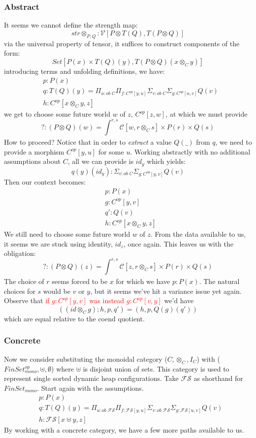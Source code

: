 \documentclass{article}
\newcommand{\red}[1]{\textcolor{red}{#1}}
\begin{document}
\subsubsection{Abstract}
It seems we cannot define the strength map:
\[
    str\otimes_{P,Q} : \mathcal{V}[ P \otimes T(Q), T (P \otimes Q)]
\]
via the universal property of tensor, it suffices to construct components of the form:
\[
    Set[P(x) \times T(Q)(y) ,T(P \otimes Q)(x \otimes_C y) ]
\]
introducing terms and unfolding definitions, we have:
\begin{align*}
    &p : P(x)\\
    &q : T(Q)(y) = \Pi_{u : ob \; C}\Pi_{f : C^{op}[ y , u]}\Sigma_{v : ob \;C}\Sigma_{g : C^{op}[ u , v ]}Q(v)\\
    &h : C^{op}[x\otimes_C y , z]
\end{align*}
we get to choose some future world $w$ of $z$, $C^{op}[z , w]$, 
at which we must provide 
\[ 
    ? : (P \otimes Q)(w) = \int_{}^{r,s} \mathcal{C}[ w , r \otimes_C s ] 
\times P(r) \times Q(s)
\]
How to proceed? Notice that in order to \textit{extract} a value $Q(\_)$ from $q$,
we need to provide a morphism $C^{op}[y , u]$ for some $u$. 
Working abstractly with no additional assumptions about $C$, all we can provide is $id_y$ which yields:
\[
    q(y)(id_y) : \Sigma_{v : ob \;C}\Sigma_{g : C^{op}[ y , v ]}Q(v)  
\]
Then our context becomes:
\begin{align*}
    &p : P(x)\\
    &g : C^{op}[ y , v ]\\
    &q' : Q(v)\\
    &h : C^{op}[x\otimes_C y , z]
\end{align*}
We still need to choose some future world $w$ of $z$.
From the data available to us, it seems we are stuck using identity, $id_z$, once again.
This leaves us with the obligation:
\[
    ? : (P \otimes Q)(z) = \int_{}^{r,s} \mathcal{C}[ z , r \otimes_C s ] 
\times P(r) \times Q(s)
\]
The choice of $r$ seems forced to be $x$ for which we have $p: P(x)$.
The natural choices for $s$ would be $v$ or $y$, but it seems we've hit a variance issue yet again.
Observe that \red{if $g: C^{op}[ y , v ]$ was instead $g : C^{op}[v , y]$} we'd have
\[
    ((id \otimes_C g) ;h , p , q') = (h , p , Q(g)(q'))
\]
which are equal relative to the coend quotient.
\subsubsection{Concrete}
Now we consider substituting the monoidal category ($C, \otimes_C , I_C$) with ($FinSet_{mono}^{op}, \uplus , \emptyset $)
where $\uplus$ is disjoint union of sets.
This category is used to represent single sorted dynamic heap configurations. 
Take $\mathcal{FS}$ as shorthand for $FinSet_{mono}$. Start again with the assumptions.
\begin{align*}
    &p : P(x)\\
    &q : T(Q)(y) = \Pi_{u : ob \; \mathcal{FS}}\Pi_{f : \mathcal{FS}[ y , u]}\Sigma_{v : ob \;\mathcal{FS}}\Sigma_{g : \mathcal{FS}[ u , v ]}Q(v)\\
    &h : \mathcal{FS}[x\uplus y , z]
\end{align*}
By working with a concrete category, we have a few more paths available to us.
\end{document}
